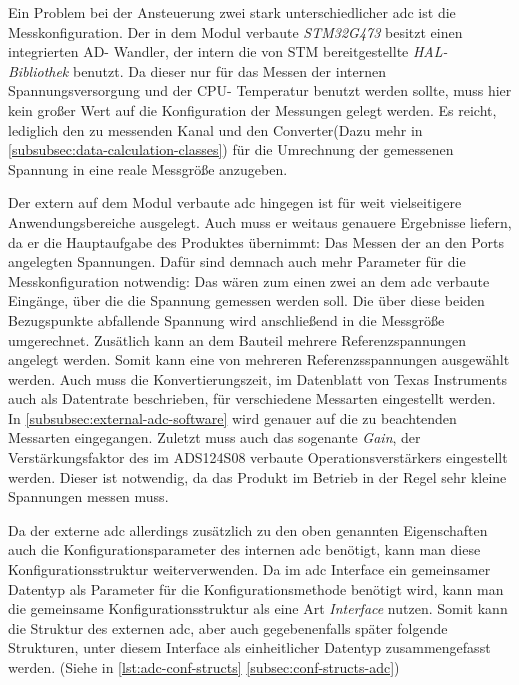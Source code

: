Ein Problem bei der Ansteuerung zwei stark unterschiedlicher \ac{adc} ist die Messkonfiguration.
Der in dem Modul verbaute \textit{STM32G473} besitzt einen integrierten AD- Wandler, der intern die von STM bereitgestellte \textit{HAL- Bibliothek} benutzt.
Da dieser nur für das Messen der internen Spannungsversorgung und der CPU- Temperatur benutzt werden sollte, muss hier kein großer Wert auf die Konfiguration der Messungen gelegt werden.
Es reicht, lediglich den zu messenden Kanal und den \glqq Converter\grqq (Dazu mehr in \autoref{subsubsec:data-calculation-classes}) für die Umrechnung der gemessenen Spannung in eine reale Messgröße anzugeben.

Der extern auf dem Modul verbaute \ac{adc} hingegen ist für weit vielseitigere Anwendungsbereiche ausgelegt.
Auch muss er weitaus genauere Ergebnisse liefern, da er die Hauptaufgabe des Produktes übernimmt: Das Messen der an den Ports angelegten Spannungen.
Dafür sind demnach auch mehr Parameter für die Messkonfiguration notwendig:\newline
Das wären zum einen zwei an dem \ac{adc} verbaute Eingänge, über die die Spannung gemessen werden soll.
Die über diese beiden Bezugspunkte abfallende Spannung wird anschließend in die Messgröße umgerechnet.\newline
Zusätlich kann an dem Bauteil mehrere Referenzspannungen angelegt werden.
Somit kann eine von mehreren Referenzsspannungen ausgewählt werden.
Auch muss die Konvertierungszeit, im Datenblatt von Texas Instruments auch als Datentrate beschrieben, für verschiedene Messarten eingestellt werden. 
In \autoref{subsubsec:external-adc-software} wird genauer auf die zu beachtenden Messarten eingegangen.
Zuletzt muss auch das sogenante \textit{Gain}, der Verstärkungsfaktor des im ADS124S08 verbaute Operationsverstärkers eingestellt werden. Dieser ist notwendig, da das Produkt im Betrieb in der Regel sehr kleine Spannungen messen muss.

Da der externe \ac{adc} allerdings zusätzlich zu den oben genannten Eigenschaften auch die Konfigurationsparameter des internen \ac{adc} benötigt, kann man diese Konfigurationsstruktur weiterverwenden.
Da im \ac{adc} Interface ein gemeinsamer Datentyp als Parameter für die Konfigurationsmethode benötigt wird, kann man die gemeinsame Konfigurationsstruktur als eine Art \textit{Interface} nutzen.
Somit kann die Struktur des externen \ac{adc}, aber auch gegebenenfalls später folgende Strukturen, unter diesem Interface als einheitlicher Datentyp zusammengefasst werden. (Siehe in \autoref{lst:adc-conf-structs} \autoref{subsec:conf-structs-adc})

